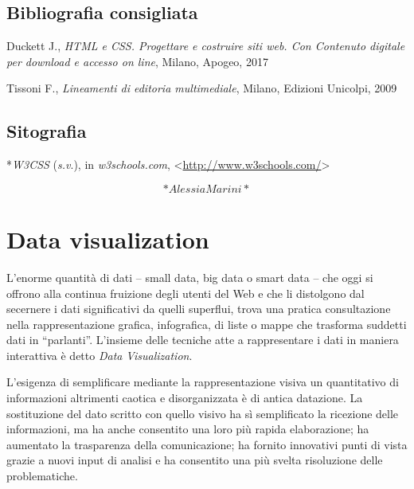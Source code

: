\documentclass[
  b5paper,
  twoside,
  11pt,
  chapterprefix=false,
  bibliography=totocnumbered,
  listof=flat]{scrbook}
\begin{document}
\hypertarget{bibliografia-consigliata-4}{%
\section*{Bibliografia consigliata}\label{bibliografia-consigliata-4}}

Duckett J., \emph{HTML e CSS. Progettare e costruire siti web. Con Contenuto
digitale per download e accesso on line}, Milano, Apogeo, 2017

Tissoni F., \emph{Lineamenti di editoria multimediale}, Milano, Edizioni
Unicolpi, 2009

\hypertarget{sitografia-6}{%
\section*{Sitografia}\label{sitografia-6}}

*\emph{W3CSS} (\emph{s.v}.), in \emph{w3schools.com},
\textless{}{\url{http://www.w3schools.com/}\textgreater{}}

\[*Alessia Marini*\]

\hypertarget{data-visualization}{%
\chapter{Data visualization}\label{data-visualization}}

L'enorme quantità di dati -- small data, big data o smart data -- che
oggi si offrono alla continua fruizione degli utenti del Web e che li
distolgono dal secernere i dati significativi da quelli superflui, trova
una pratica consultazione nella rappresentazione grafica, infografica,
di liste o mappe che trasforma suddetti dati in \enquote{parlanti}. L'insieme
delle tecniche atte a rappresentare i dati in maniera interattiva è
detto \emph{Data} \emph{Visualization}.

L'esigenza di semplificare mediante la rappresentazione visiva un
quantitativo di informazioni altrimenti caotica e disorganizzata è di
antica datazione. La sostituzione del dato scritto con quello visivo ha
sì semplificato la ricezione delle informazioni, ma ha anche consentito
una loro più rapida elaborazione; ha aumentato la trasparenza della
comunicazione; ha fornito innovativi punti di vista grazie a nuovi input
di analisi e ha consentito una più svelta risoluzione delle
problematiche.
\end{document}
